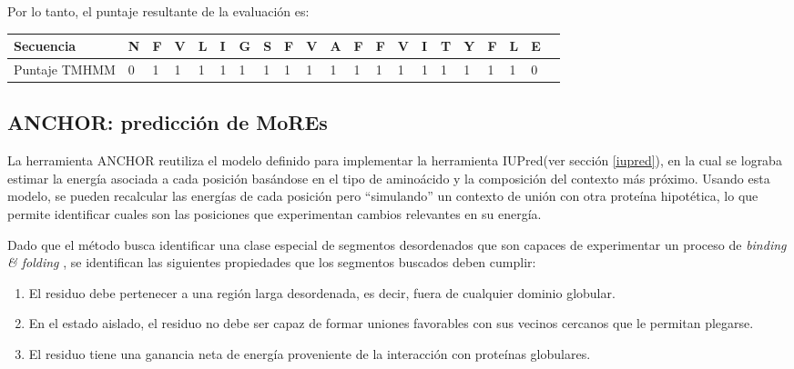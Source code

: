 Por lo tanto, el puntaje resultante de la evaluación es:

\vspace{0.5cm}
\noindent
\begin{tabular}{lllllllllllllllllllll} 
\hline 
Secuencia & \textbf{N} & \textbf{F} & \textbf{V} & \textbf{L} & \textbf{I} & \textbf{G} & \textbf{S} & \textbf{F} & \textbf{V} & \textbf{A} & \textbf{F} & \textbf{F} & \textbf{V} & \textbf{I} & \textbf{T} & \textbf{Y} & \textbf{F} & \textbf{L} & \textbf{E}  \\ \hline
Puntaje TMHMM & 0 & 1 & 1 & 1 & 1 & 1 & 1 & 1 & 1 & 1 & 1 & 1 & 1 & 1 & 1 & 1 & 1 & 1 & 0\\ \hline
\end{tabular}



 
 
 
 
\subsection{ANCHOR: predicción de MoREs} \label{anchor}

La herramienta ANCHOR\cite{meszaros2009prediction} reutiliza el modelo definido para implementar la herramienta IUPred(ver sección \ref{iupred}), en la cual se lograba estimar la energía asociada a cada posición basándose en 
el tipo de aminoácido y la composición del contexto más próximo. Usando esta modelo, se pueden recalcular las energías de cada posición pero ``simulando'' un contexto de unión con otra proteína hipotética, lo que permite
identificar cuales son las posiciones que experimentan cambios relevantes en su energía. 

Dado que el método busca identificar una clase especial de segmentos desordenados que son capaces de experimentar un proceso de \textit{binding \& folding}   , 
se identifican las siguientes propiedades que los segmentos buscados deben cumplir:
\begin{enumerate}
 \item El residuo debe pertenecer a una región larga desordenada, es decir, fuera de cualquier dominio globular.
 \item En el estado aislado, el residuo no debe ser capaz de formar uniones favorables con sus vecinos cercanos que le permitan plegarse.
 \item El residuo tiene una ganancia neta de energía proveniente de la interacción con proteínas globulares.
 \end{enumerate}

